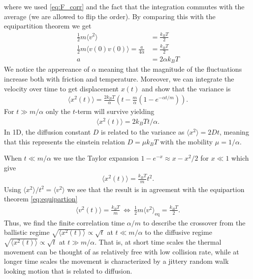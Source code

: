 where we used \cref{eq:F_corr} and the fact that the integration commutes with
the average (we are allowed to flip the order). By comparing this with the
equipartition theorem we get 
\begin{align*}
  \frac{1}{2}m\langle  v^2 \rangle &= \frac{k_BT}{2} \\
  \frac{1}{2}m\langle  v(0) v(0) \rangle = \frac{a}{4\alpha} &= \frac{k_BT}{2} \\
  a &=  2\alpha k_B T 
\end{align*}
We notice the appereance of $\alpha$ meaning that the magnitude of the
fluctuations increase both with friction and temperature. Moreover, we can
integrate the velocity over time to get displacement $x(t)$ and show that the
variance is 
\begin{align*}
  \big\langle x^2(t) \big\rangle = \frac{2 k_B T}{\alpha} \left(t - \frac{m}{\alpha}\left(1 - e^{-\alpha t/m} \right) \right).
\end{align*}
For $t \gg m/\alpha$ only the $t$-term will survive yielding
\begin{align*}
  \langle x^2(t) \rangle = 2 k_BTt/\alpha.
\end{align*}
In 1D, the diffusion constant $D$ is related to the variance as $\langle x^2
\rangle = 2Dt$, meaning that this represents the einstein relation $D = \mu k_B
T$ with the mobility $\mu = 1/\alpha$.

When $t \ll m/\alpha$ we use the Taylor expansion $1 - e^{-x} \approx x - x^2/2$
for $x\ll 1$ which give
\begin{align*}
  \big\langle x^2(t) \big\rangle = \frac{k_B T}{m} t^2.
\end{align*}
Using $\langle x^2 \rangle / t^2 = \langle v^2 \rangle$ we see that the result is in agreement with the equipartion theorem \cref{eq:equipartion}
\begin{align*}
  \big\langle v^2(t) \big\rangle = \frac{k_B T}{m} \ \Longleftrightarrow \ \frac{1}{2}m\langle v^2 \rangle_{\text{eq}} = \frac{k_B T}{2}.
\end{align*}
Thus, we find the finite correlation time $\alpha/m$ to describe the crossover from the ballistic regime $\sqrt{\langle x^2(t)
\rangle} \propto \sqrt{t}$ at $t \ll m/\alpha$ to the diffusive regime $\sqrt{\langle x^2(t)\rangle} \propto \sqrt{t}$ at $t \gg m/\alpha$. That is, at short time scales the thermal movement can be thought of as relatively free with low collision rate, while at longer time scales the movement is characterized by a jittery random walk looking motion that is related to diffusion. 


